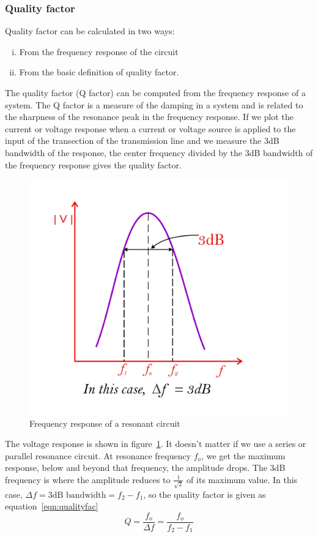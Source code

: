 \subsubsection{Quality factor}
Quality factor can be calculated in two ways:
\begin{enumerate}[(i)]
\item From the frequency response of the circuit
\item From the basic definition of quality factor.
\end{enumerate}
The quality factor (Q factor) can be computed from the frequency response of a system. The Q factor is a measure of the damping in a system and is related to the sharpness of the resonance peak in the frequency response. If we plot the current or voltage response when a current or voltage source is applied to the input of the transection of the transmission line and we measure the 3dB bandwidth of the response, the center frequency divided by the 3dB bandwidth of the frequency response gives the quality factor.
\begin{figure}[h]
\centering
\includegraphics[width=0.8\linewidth]{./graphics/fig2}
\caption{Frequency response of a resonant circuit}
\label{fig:fig2}
\end{figure}

The voltage response is shown in figure~\ref{fig:fig2}. It doesn't matter if we use a series or parallel resonance circuit. At resonance frequency $ f_{o} $, we get the maximum response, below and beyond that frequency, the amplitude drops. The 3dB frequency is where the amplitude reduces to $ \frac{1}{\sqrt{2}} $ of its maximum value. In this case, $ \Delta f=3\text{dB bandwidth} =f_{2}-f_{1} $, so the quality factor is given as equation~\eqref{eqn:qualityfac}
\begin{equation}
Q=\frac{f_{o}}{\Delta f}=\frac{f_{o}}{f_{2}-f_{1}}
\label{eqn:qualityfac}
\end{equation} 

